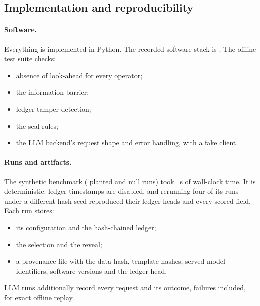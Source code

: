 \subsection{Implementation and reproducibility}

\paragraph{Software.} Everything is implemented in Python. The recorded
software stack is \SynSoftware{}. The offline test suite checks:
\begin{itemize}
  \item absence of look-ahead for every operator;
  \item the information barrier;
  \item ledger tamper detection;
  \item the seal rules;
  \item the LLM backend's request shape and error handling, with a fake
    client.
\end{itemize}

\paragraph{Runs and artifacts.} The synthetic benchmark (\SynRuns{} planted
and \SynNullRuns{} null runs) took \SynRuntime{}~s of wall-clock time. It is
deterministic: ledger timestamps are disabled, and rerunning four of its runs
under a different hash seed reproduced their ledger heads and every scored
field. Each run stores:
\begin{itemize}
  \item its configuration and the hash-chained ledger;
  \item the selection and the reveal;
  \item a provenance file with the data hash, template hashes, served model
    identifiers, software versions and the ledger head.
\end{itemize}
LLM runs additionally record every request and its outcome, failures
included, for exact offline replay.
